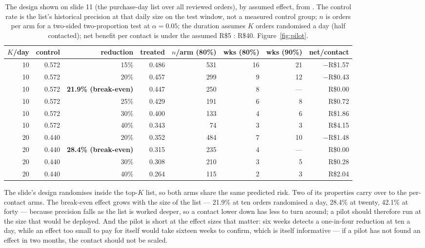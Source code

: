 \begin{table}[htbp]
\centering
\caption{The design shown on slide 11 (the purchase-day list over all reviewed
orders), by assumed effect, from . The
control rate is the list's historical precision at that daily size on the test
window, not a measured control group; $n$ is orders per arm for a two-sided
two-proportion test at $\alpha = 0.05$; the duration assumes $K$ orders randomised
a day (half contacted); net benefit per contact is under the assumed R\$5 :
R\$40. Figure~\ref{fig:pilot}.}
\label{tab:pilot}
\scriptsize
\setlength{\tabcolsep}{3pt}
\begin{tabular}{@{}rrrrrrrr@{}}
\toprule
\textbf{$K$/day} & \textbf{control} & \textbf{reduction} & \textbf{treated} & \textbf{$n$/arm (80\%)} & \textbf{wks (80\%)} & \textbf{wks (90\%)} & \textbf{net/contact} \\
\midrule
10 & 0.572 & 15\% & 0.486 & 531 & 16 & 21 & $-$R\$1.57 \\
10 & 0.572 & 20\% & 0.457 & 299 & 9  & 12 & $-$R\$0.43 \\
10 & 0.572 & \textbf{21.9\% (break-even)} & 0.447 & 250 & 8 & --- & R\$0.00 \\
10 & 0.572 & 25\% & 0.429 & 191 & 6  & 8  & R\$0.72 \\
10 & 0.572 & 30\% & 0.400 & 133 & 4  & 6  & R\$1.86 \\
10 & 0.572 & 40\% & 0.343 & 74  & 3  & 3  & R\$4.15 \\
\midrule
20 & 0.440 & 20\% & 0.352 & 484 & 7  & 10 & $-$R\$1.48 \\
20 & 0.440 & \textbf{28.4\% (break-even)} & 0.315 & 235 & 4 & --- & R\$0.00 \\
20 & 0.440 & 30\% & 0.308 & 210 & 3  & 5  & R\$0.28 \\
20 & 0.440 & 40\% & 0.264 & 115 & 2  & 3  & R\$2.04 \\
\bottomrule
\end{tabular}
\end{table}

The slide's design randomises inside the top-$K$ list, so both arms share the
same predicted risk. Two of its properties carry over to the per-contact arms.
The break-even effect grows with the size of the list --- 21.9\% at ten orders
randomised a day, 28.4\% at twenty, 42.1\% at forty --- because precision falls
as the list is worked deeper, so a contact lower down has less to turn around; a
pilot should therefore run at the size that would be deployed. And the pilot is
short at the effect sizes that matter: six weeks detects a one-in-four reduction
at ten a day, while an effect too small to pay for itself would take sixteen
weeks to confirm, which is itself informative --- if a pilot has not found an
effect in two months, the contact should not be scaled.

